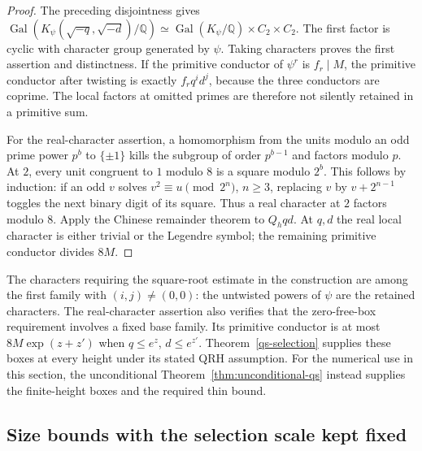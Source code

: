 \begin{proof}
The preceding disjointness gives
$\operatorname{Gal}(K_\psi(\sqrt{-q},\sqrt{-d})/\mathbb Q)
\simeq\operatorname{Gal}(K_\psi/\mathbb Q)\times C_2\times C_2$.
The first factor is cyclic with character group generated by $\psi$.
Taking characters proves the first assertion and distinctness.
If the primitive conductor of $\psi^r$ is $f_r\mid M$, the primitive
conductor after twisting is exactly $f_rq^id^j$, because the three
conductors are coprime. The local factors at omitted primes are
therefore not silently retained in a primitive sum.

For the real-character assertion, a homomorphism from the units
modulo an odd prime power $p^b$ to $\{\pm1\}$ kills the subgroup
of order $p^{b-1}$ and factors modulo $p$. At $2$, every unit
congruent to $1$ modulo $8$ is a square modulo $2^b$. This follows
by induction: if an odd $v$ solves $v^2\equiv u\pmod{2^n}$,
$n\ge3$, replacing $v$ by $v+2^{n-1}$ toggles the next binary
digit of its square. Thus a real character at $2$ factors modulo
$8$. Apply the Chinese remainder theorem to $Q_hqd$. At $q,d$
the real local character is either trivial or the Legendre symbol;
the remaining primitive conductor divides $8M$.
\end{proof}

The characters requiring the square-root estimate in the construction
are among the first family with $(i,j)\ne(0,0)$: the untwisted powers
of $\psi$ are the retained characters. The real-character assertion
also verifies that the zero-free-box requirement involves a fixed
base family. Its primitive conductor is at most
$8M\exp(z+z')$ when $q\le e^z$, $d\le e^{z'}$.
Theorem~\ref{qs-selection} supplies these boxes at every height under
its stated QRH assumption. For the numerical use in this section,
the unconditional Theorem~\ref{thm:unconditional-qs} instead supplies
the finite-height boxes and the required thin bound.

\subsection{Size bounds with the selection scale kept fixed}

